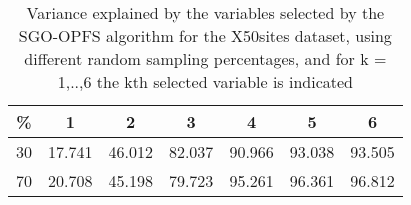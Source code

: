 \begin{table}
	\begin{center}
		\begin{tabular}{c c c c c c c}
			\% & 1 & 2 & 3 & 4 & 5 & 6 \\
			\hline
			30 & 17.741 & 46.012 & 82.037 & 90.966 & 93.038 & 93.505 \\
			70 & 20.708 & 45.198 & 79.723 & 95.261 & 96.361 & 96.812 \\
		\end{tabular}
	\end{center}
	\caption{Variance explained by the variables selected by the SGO-OPFS algorithm for the X50sites dataset, using different random sampling percentages, and for k = 1,..,6 the kth selected variable is indicated}
\end{table}
